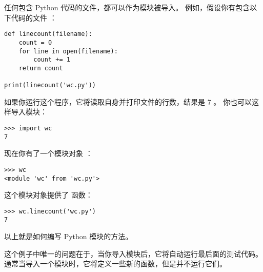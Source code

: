 {{{{{{{%

任何包含 Python 代码的文件，都可以作为模块被导入。
例如，假设你有包含以下代码的文件  ：

\begin{lstlisting}
def linecount(filename):
    count = 0
    for line in open(filename):
        count += 1
    return count

print(linecount('wc.py'))
\end{lstlisting}

%

如果你运行这个程序，它将读取自身并打印文件的行数，结果是 7 。
你也可以这样导入模块：

\begin{lstlisting}
>>> import wc
7
\end{lstlisting}

%

现在你有了一个模块对象  ：

  

\begin{lstlisting}
>>> wc
<module 'wc' from 'wc.py'>
\end{lstlisting}

%

这个模块对象提供了  函数：

\begin{lstlisting}
>>> wc.linecount('wc.py')
7
\end{lstlisting}

%

以上就是如何编写 Python 模块的方法。


这个例子中唯一的问题在于，当你导入模块后，它将自动运行最后面的测试代码。
通常当导入一个模块时，它将定义一些新的函数，但是并不运行它们。

  

}}}}}}}
